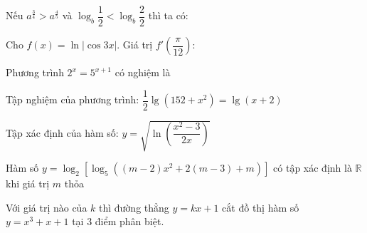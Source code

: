 \begin{question}%
Nếu $a^{\frac{3}{4}}> a^{\frac{4}{5}}$ và $\log_b \dfrac{1}{2}<\log_b \dfrac{2}{2}$ thì ta có:
\vspace{0.2cm}
\datcot
\bonpa
{}
{}
{}
{}
\end{question}

\begin{question}%
Cho $f(x)=\ln\left|\cos 3x\right|$. Giá trị $f'\left(\dfrac{\pi}{12}\right)$:
\vspace{0.2cm}
\datcot
\bonpa
{}
{}
{}
{}
\end{question}

\begin{question}%
Phương trình $2^x=5^{x+1}$ có nghiệm là
\vspace{0.2cm}
\datcot
\bonpa
{}
{}
{}
{}
\end{question}

\begin{question}%
Tập nghiệm của phương trình: $\dfrac{1}{2}\lg\left(152+x^2\right)=\lg\left(x+2\right)$
\vspace{0.2cm}
\datcot
\bonpa
{}
{}
{}
{}
\end{question}

\begin{question}%
Tập xác định của hàm số: $y=\sqrt{\ln\left(\dfrac{x^2-3}{2x}\right)}$
\vspace{0.2cm}
\datcot
\bonpa
{}
{\sai{$\left[-1; 0\right) \cup \left(3; +\infty\right)$.}}
{\dung{$\left[-1; 0\right) \cup \left[3; +\infty\right)$.}}
{\sai{$\left[-1; 0\right] \cup \left[3; +\infty\right)$.}}
\end{question}

\begin{question}%
Hàm số $y=\log_2\left[\log_5\left(\left(m-2\right)x^2+2(m-3)+m\right)\right]$ có tập xác định là $\mathbb{R}$ khi giá trị $m$ thỏa
\vspace{0.2cm}
\datcot
\bonpa
{}
{}
{}
{}
\end{question}

\begin{question}%
Với giá trị nào của $k$ thì đường thẳng $y=kx+1$ cắt đồ thị hàm số $y=x^3+x+1$ tại 3 điểm phân biệt.
\vspace{0.2cm}
\datcot
\bonpa
{}
{}
{}
{}
\end{question}

